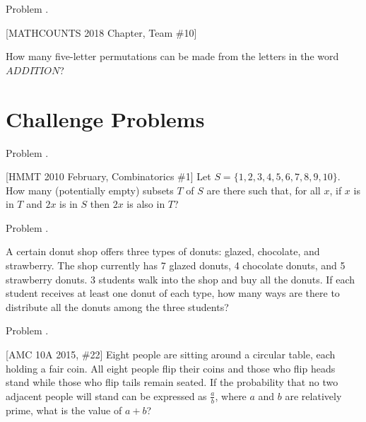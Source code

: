 \documentclass[9pt]{beamer}
\newcounter{problem}[section]
\begin{document}
\begin{frame}[t, fragile]{Problem \thesection.\theproblem}
    \begin{block}{}[MATHCOUNTS 2018 Chapter, Team \#10]

    How many five-letter permutations can be made from the letters in the word $ADDITION$?
    
    \end{block}
\end{frame}
% 
\section{Challenge Problems}
\begin{frame}[t, fragile]{Problem \thesection.\theproblem}
    \begin{block}{} [HMMT 2010 February, Combinatorics \#1]
     Let $S = \{1, 2, 3, 4, 5, 6, 7, 8, 9, 10\}$. How many (potentially empty) subsets $T$ of $S$ are there such that, for all $x$, if $x$ is in $T$ and $2x$ is in $S$ then $2x$ is also in $T$?
     
    \end{block}
\end{frame}
\begin{frame}[t, fragile]{Problem \thesection.\theproblem}
    \begin{block}{}
    A certain donut shop offers three types of donuts: glazed, chocolate, and strawberry. The shop currently has 7 glazed donuts, 4 chocolate donuts, and 5 strawberry donuts. 3 students walk into the shop and buy all the donuts. If each student receives at least one donut of each type, how many ways are there to distribute all the donuts among the three students?
    
    \end{block}
\end{frame}
\begin{frame}[t, fragile]{Problem \thesection.\theproblem}
    \begin{block}{}[AMC 10A 2015, \#22]
    Eight people are sitting around a circular table, each holding a fair coin. All eight people flip their coins and those who flip heads stand while those who flip tails remain seated. If the probability that no two adjacent people will stand can be expressed as $\frac{a}{b}$, where $a$ and $b$ are relatively prime, what is the value of $a+b$?
    
    \end{block}
\end{frame}
\end{document}
